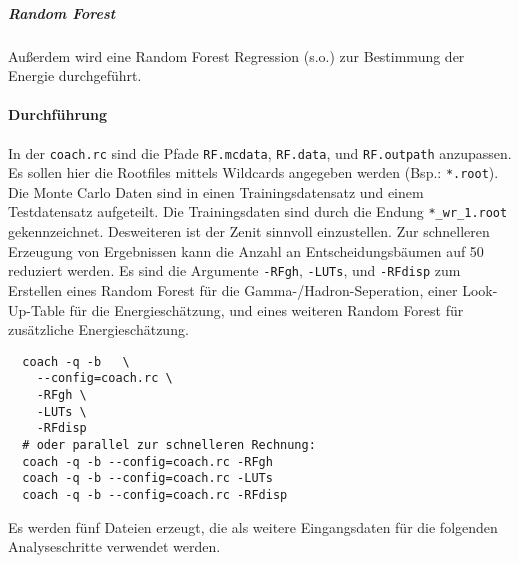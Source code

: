 \subparagraph{Random Forest}
Außerdem wird eine Random Forest Regression (s.o.)
zur Bestimmung der Energie durchgeführt.

\paragraph{Durchführung}%
In der \texttt{coach.rc} sind die Pfade
\texttt{RF.mcdata},
\texttt{RF.data},
und \texttt{RF.outpath}
anzupassen.
Es sollen hier die Rootfiles mittels Wildcards angegeben werden
(Bsp.: \texttt{*.root}).
Die Monte Carlo Daten sind in einen Trainingsdatensatz
und einem Testdatensatz aufgeteilt.
Die Trainingsdaten sind durch die Endung
\texttt{*\_wr\_1.root} gekennzeichnet.
Desweiteren ist der Zenit sinnvoll einzustellen.
Zur schnelleren Erzeugung von Ergebnissen kann die Anzahl an
Entscheidungsbäumen auf \num{50}
reduziert werden.
Es sind die Argumente
\texttt{-RFgh}, \texttt{-LUTs}, und \texttt{-RFdisp}
zum Erstellen eines Random Forest für die Gamma-/Hadron-Seperation,
einer Look-Up-Table für die Energieschätzung,
und eines weiteren Random Forest für zusätzliche Energieschätzung.

\begin{lstlisting}
  coach -q -b	\
    --config=coach.rc \
    -RFgh \
    -LUTs \
    -RFdisp
  # oder parallel zur schnelleren Rechnung:
  coach -q -b --config=coach.rc -RFgh
  coach -q -b --config=coach.rc -LUTs
  coach -q -b --config=coach.rc -RFdisp
\end{lstlisting}

Es werden fünf Dateien erzeugt,
die als weitere Eingangsdaten für die folgenden Analyseschritte verwendet
werden.
